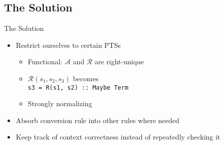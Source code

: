 \documentclass{beamer}
\begin{document}
\subsection{The Solution}

\begin{frame}{The Solution}

  \begin{itemize}
    \item
      Restrict ourselves to certain PTSs
      \begin{itemize}
        \item Functional: $\mathcal{A}$ and $\mathcal{R}$ are right-unique
        \item $\mathcal{R}(s_1, s_2, s_3)$ becomes \\
              \texttt{s3 = R(s1, s2) :: Maybe Term}
        \item Strongly normalizing
      \end{itemize}
    \item
      Absorb conversion rule into other rules where needed
    \item
      Keep track of context correctness instead of repeatedly checking it
  \end{itemize}

\end{frame}


\newcommand{\vcdash}{\vdash_{vc}}
\newcommand{\vtdash}{\vdash_{vt}}
\end{document}
